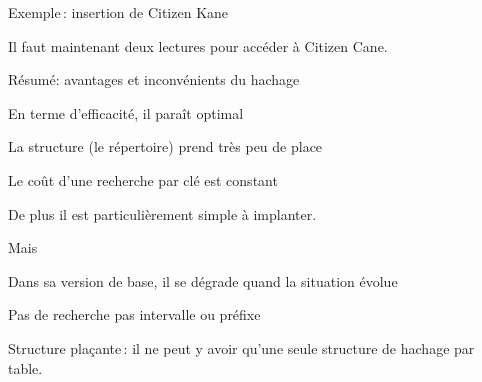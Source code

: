 \begin{frame}{Exemple\,: insertion de Citizen Kane}


\vfill

\begin{blocgauche}
Il faut maintenant deux lectures pour accéder à Citizen Cane.
\end{blocgauche}
\end{frame}


\begin{frame}{Résumé: avantages et inconvénients du hachage}


En terme d'efficacité, il paraît optimal

\begin{redbullet}
  \item La structure (le répertoire) prend très peu de place
  \item Le coût d'une recherche par clé est constant
  \item De plus il est particulièrement simple à implanter.
\end{redbullet}

\vfill

Mais

\vfill
\begin{redbullet}
  \item Dans sa version de base, il se dégrade quand la situation évolue
  \item Pas de recherche pas intervalle ou préfixe
  \item Structure plaçante\,: il ne peut y avoir qu'une seule structure de hachage par table.
\end{redbullet}

\end{frame}
